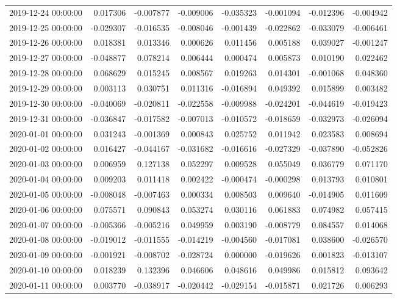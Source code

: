 \begin{tabular}{lrrrrrrr}
2019-12-24 00:00:00 & 0.017306 & -0.007877 & -0.009006 & -0.035323 & -0.001094 & -0.012396 & -0.004942 \\
2019-12-25 00:00:00 & -0.029307 & -0.016535 & -0.008046 & -0.001439 & -0.022862 & -0.033079 & -0.006461 \\
2019-12-26 00:00:00 & 0.018381 & 0.013346 & 0.000626 & 0.011456 & 0.005188 & 0.039027 & -0.001247 \\
2019-12-27 00:00:00 & -0.048877 & 0.078214 & 0.006444 & 0.000474 & 0.005873 & 0.010190 & 0.022462 \\
2019-12-28 00:00:00 & 0.068629 & 0.015245 & 0.008567 & 0.019263 & 0.014301 & -0.001068 & 0.048360 \\
2019-12-29 00:00:00 & 0.003113 & 0.030751 & 0.011316 & -0.016894 & 0.049392 & 0.015899 & 0.003482 \\
2019-12-30 00:00:00 & -0.040069 & -0.020811 & -0.022558 & -0.009988 & -0.024201 & -0.044619 & -0.019423 \\
2019-12-31 00:00:00 & -0.036847 & -0.017582 & -0.007013 & -0.010572 & -0.018659 & -0.032973 & -0.026094 \\
2020-01-01 00:00:00 & 0.031243 & -0.001369 & 0.000843 & 0.025752 & 0.011942 & 0.023583 & 0.008694 \\
2020-01-02 00:00:00 & 0.016427 & -0.044167 & -0.031682 & -0.016616 & -0.027329 & -0.037890 & -0.052826 \\
2020-01-03 00:00:00 & 0.006959 & 0.127138 & 0.052297 & 0.009528 & 0.055049 & 0.036779 & 0.071170 \\
2020-01-04 00:00:00 & 0.009203 & 0.011418 & 0.002422 & -0.000474 & -0.000298 & 0.013793 & 0.010801 \\
2020-01-05 00:00:00 & -0.008048 & -0.007463 & 0.000334 & 0.008503 & 0.009640 & -0.014905 & 0.011609 \\
2020-01-06 00:00:00 & 0.075571 & 0.090843 & 0.053274 & 0.030116 & 0.061883 & 0.074982 & 0.057415 \\
2020-01-07 00:00:00 & -0.005366 & -0.005216 & 0.049959 & 0.003190 & -0.008779 & 0.084557 & 0.014068 \\
2020-01-08 00:00:00 & -0.019012 & -0.011555 & -0.014219 & -0.004560 & -0.017081 & 0.038600 & -0.026570 \\
2020-01-09 00:00:00 & -0.001921 & -0.008702 & -0.028724 & 0.000000 & -0.019626 & 0.001823 & -0.013107 \\
2020-01-10 00:00:00 & 0.018239 & 0.132396 & 0.046606 & 0.048616 & 0.049986 & 0.015812 & 0.093642 \\
2020-01-11 00:00:00 & 0.003770 & -0.038917 & -0.020442 & -0.029154 & -0.015871 & 0.021726 & 0.006293 \\

\end{tabular}
